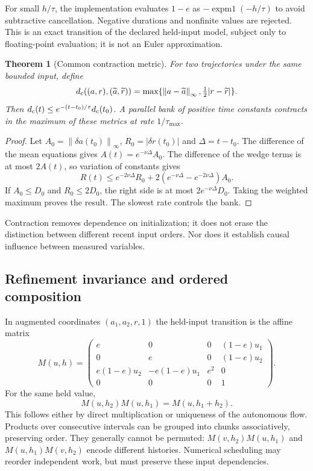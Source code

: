 \documentclass[11pt,a4paper]{article}
\newtheorem{theorem}{Theorem}[section]
\theoremstyle{definition}\newtheorem{definition}[theorem]{Definition}
\newcommand{\norm}[1]{\left\lVert#1\right\rVert}
\begin{document}
For small $h/\tau$, the implementation evaluates $1-e$ as $-\operatorname{expm1}(-h/\tau)$ to avoid subtractive cancellation. Negative durations and nonfinite values are rejected. This is an exact transition of the declared held-input model, subject only to floating-point evaluation; it is not an Euler approximation.

\begin{theorem}[Common contraction metric]\label{thm:clock}
For two trajectories under the same bounded input, define
\[
 d_{\rm c}((a,r),(\widetilde a,\widetilde r))
 =\max\{\norm{a-\widetilde a}_\infty,\tfrac12|r-\widetilde r|\}.
\]
Then $d_{\rm c}(t)\leq e^{-(t-t_0)/\tau}d_{\rm c}(t_0)$. A parallel bank of positive time constants contracts in the maximum of these metrics at rate $1/\tau_{\max}$.
\end{theorem}
\begin{proof}
Let $A_0=\norm{\delta a(t_0)}_\infty$, $R_0=|\delta r(t_0)|$ and $\Delta=t-t_0$. The difference of the mean equations gives $A(t)=e^{-\nu\Delta}A_0$. The difference of the wedge terms is at most $2A(t)$, so variation of constants gives
\[
 R(t)\leq e^{-2\nu\Delta}R_0+
 2(e^{-\nu\Delta}-e^{-2\nu\Delta})A_0.
\]
If $A_0\leq D_0$ and $R_0\leq2D_0$, the right side is at most $2e^{-\nu\Delta}D_0$. Taking the weighted maximum proves the result. The slowest rate controls the bank.
\end{proof}

Contraction removes dependence on initialization; it does not erase the distinction between different recent input orders. Nor does it establish causal influence between measured variables.

\subsection{Refinement invariance and ordered composition}
In augmented coordinates $(a_1,a_2,r,1)$ the held-input transition is the affine matrix
\begin{equation}
 M(u,h)=\begin{pmatrix}
 e&0&0&(1-e)u_1\\
 0&e&0&(1-e)u_2\\
 e(1-e)u_2&-e(1-e)u_1&e^2&0\\
 0&0&0&1
 \end{pmatrix}.\label{eq:transfer}
\end{equation}
For the same held value,
\begin{equation}
 M(u,h_2)M(u,h_1)=M(u,h_1+h_2).\label{eq:refinement}
\end{equation}
This follows either by direct multiplication or uniqueness of the autonomous flow. Products over consecutive intervals can be grouped into chunks associatively, preserving order. They generally cannot be permuted: $M(v,h_2)M(u,h_1)$ and $M(u,h_1)M(v,h_2)$ encode different histories. Numerical scheduling may reorder independent work, but must preserve these input dependencies.
\end{document}
